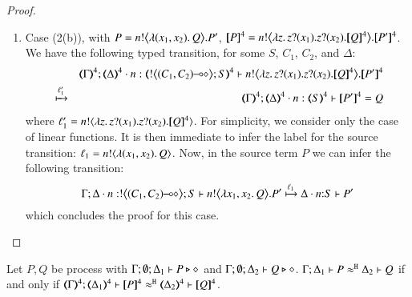 \begin{proof}
\begin{enumerate}[1.]
\item Case (2(b)), with $P =  \bbout{n}{\abs{(x_1,x_2)} Q} P' $, 
$\map{P}^{4} = 
		\bbout{n}{\abs{z}\binp{z}{x_1}\binp{z}{x_2} \map{Q}^{4}} \map{P'}^{4}$.
		We have the following  typed transition, for some $S$, $C_1$, $C_2$, and $\Delta$:
\begin{eqnarray*}
& & \mapt{\Gamma}^{4}; 
\mapt{\Delta}^{4}\cat n:\tmap{\bbtout{\lhot{(C_1,  C_2)}} S}{4}
\proves 
\bbout{n}{\abs{z}\binp{z}{x_1}\binp{z}{x_2} \map{Q}^{4}} \map{P'}^{4} \\
& \hby{\ell'_1} & 
\mapt{\Gamma}^{4}; 
\mapt{\Delta}^{4}\cat n:\tmap{ S}{4} 
\proves 
\map{P'}^{4} = Q
\end{eqnarray*}
where
$\ell'_1 = \bactout{n}{\abs{z}\binp{z}{x_1} \binp{z}{x_2} \map{Q}^{4}}$.
For simplicity, we consider only the case of linear functions.
It is then immediate to infer the label for the source transition:
$\ell_1 = \bactout{n}{\abs{(x_1,  x_2)}{Q}} $. 
Now, in the source term $P$ we can infer the following transition:
$$
\stytra{\Gamma}{\ell_1}{\Delta\cat n:\bbtout{\lhot{(C_1,  C_2)}} S}{ \bbout{n}{\abs{x_1,x_2} Q} P'}{\Delta\cat n{:}S}{P'}
$$
which concludes the proof for this case.
\end{enumerate}
\end{proof}


\begin{proposition}\myrm
	\label{app:prop:fulla_pHOp_to_HOp}
	Let $P, Q$ be \HOpp process with $\Gamma; \es; \Delta_1 \proves P \hastype \Proc$ and 
	$\Gamma; \es; \Delta_2 \proves Q \hastype \Proc$.
	$\horel{\Gamma}{\Delta_1}{P}{\hwb}{\Delta_2}{Q}$ if and only if $\horel{\tmap{\Gamma}{4}}{\tmap{\Delta_1}{4}}{\pmap{P}{4}}{\hwb}{\tmap{\Delta_2}{4}}{\pmap{Q}{4}}$.
\end{proposition}


